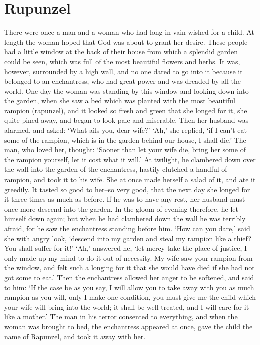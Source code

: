 
\chapter{Rupunzel}

There were once a man and a woman who had long in vain wished for a child. At length the woman hoped that God was about to grant her desire. These people had a little window at the back of their house from which a splendid garden could be seen, which was full of the most beautiful flowers and herbs. It was, however, surrounded by a high wall, and no one dared to go into it because it belonged to an enchantress, who had great power and was dreaded by all the world. One day the woman was standing by this window and looking down into the garden, when she saw a bed which was planted with the most beautiful rampion (rapunzel), and it looked so fresh and green that she longed for it, she quite pined away, and began to look pale and miserable. Then her husband was alarmed, and asked: `What ails you, dear wife?' `Ah,' she replied, `if I can't eat some of the rampion, which is in the garden behind our house, I shall die.' The man, who loved her, thought: `Sooner than let your wife die, bring her some of the rampion yourself, let it cost what it will.' At twilight, he clambered down over the wall into the garden of the enchantress, hastily clutched a handful of rampion, and took it to his wife. She at once made herself a salad of it, and ate it greedily. It tasted so good to her--so very good, that the next day she longed for it three times as much as before. If he was to have any rest, her husband must once more descend into the garden. In the gloom of evening therefore, he let himself down again; but when he had clambered down the wall he was terribly afraid, for he saw the enchantress standing before him. `How can you dare,' said she with angry look, `descend into my garden and steal my rampion like a thief? You shall suffer for it!' `Ah,' answered he, `let mercy take the place of justice, I only made up my mind to do it out of necessity. My wife saw your rampion from the window, and felt such a longing for it that she would have died if she had not got some to eat.' Then the enchantress allowed her anger to be softened, and said to him: `If the case be as you say, I will allow you to take away with you as much rampion as you will, only I make one condition, you must give me the child which your wife will bring into the world; it shall be well treated, and I will care for it like a mother.' The man in his terror consented to everything, and when the woman was brought to bed, the enchantress appeared at once, gave the child the name of Rapunzel, and took it away with her.

